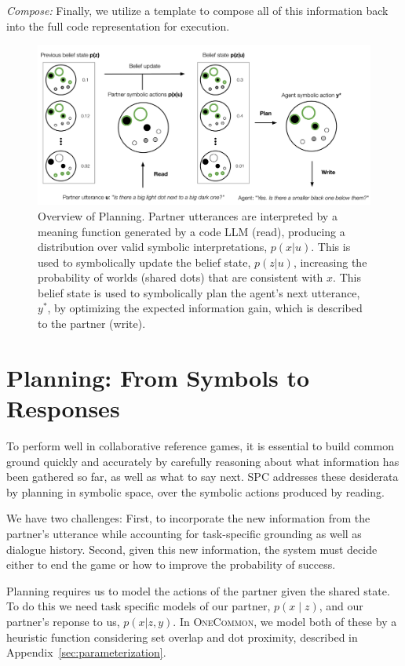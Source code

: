 \documentclass[11pt]{article}
\newcommand{\system}{SPC}
\begin{document}
\noindent \textit{Compose:} Finally, we utilize a template to compose all of this information back into the full code representation for execution.

\begin{figure}[t]
\centering
\includegraphics[width=2\columnwidth]{imgs/system-diagram.pdf}
\caption{
\label{fig:system}
Overview of Planning.
Partner utterances are interpreted by a meaning function generated by a code LLM (read), producing a distribution over valid symbolic interpretations, $p(x|u)$.
This is used to symbolically update the belief state, $p(z|u)$, increasing the probability of worlds (shared dots) that are consistent with $x$.
This belief state is used to symbolically plan the agent's next utterance, $y^*$, by optimizing the expected information gain, which is described to the partner (write).
}			
\end{figure}

\section{Planning: From Symbols to Responses}

To perform well in collaborative reference games, it is essential to build common ground quickly and accurately by carefully reasoning about what information has been gathered so far, as well as what to say next.
\system{} addresses these desiderata by planning in symbolic space, over the symbolic actions produced by reading.

We have two challenges: First, to incorporate the new information from the partner's utterance while accounting for task-specific grounding as well as dialogue history. Second, given this new information, the system must decide either to end the game or how to improve the probability of success.

Planning requires us to model the actions of the partner given the shared state. To do this we need task specific models of our partner, $p(x \mid z)$, and our partner's reponse to us, $p(x | z, y)$.  In \textsc{OneCommon}, we model both of these by a heuristic function considering set overlap and dot proximity, described in Appendix~\ref{sec:parameterization}.
\end{document}
